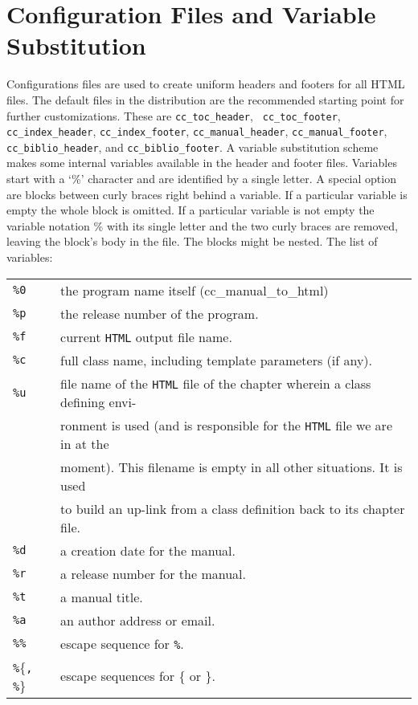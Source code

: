 \documentclass[11pt]{article}
\begin{document}
\section{Configuration Files and Variable Substitution}

 Configurations files are
used to create uniform headers and footers for all HTML files.  The
default files in the distribution are the recommended starting point
for further customizations. These are {\tt cc\_toc\_header}, {\tt
  cc\_toc\_footer}, {\tt cc\_index\_header}, {\tt cc\_index\_footer},
{\tt cc\_manual\_header}, {\tt cc\_manual\_footer}, {\tt
  cc\_biblio\_header}, and {\tt cc\_biblio\_footer}.  A variable
substitution scheme makes some internal variables available in the
header and footer files. Variables start with a `\%' character and are
identified by a single letter. A special option are blocks between
curly braces right behind a variable. If a particular variable is
empty the whole block is omitted. If a particular variable is not
empty the variable notation \% with its single letter and the two
curly braces are removed, leaving the block's body in the file. The
blocks might be nested. The list of variables:

\begin{tabular}{ll}
    {\tt\%0}  &  the program name itself (cc\_manual\_to\_html) \\
    {\tt\%p}  &  the release number of the program. \\
    {\tt\%f}  &  current {\tt HTML} output file name. \\
    {\tt\%c}  &  full class name, including template parameters (if any). \\
    {\tt\%u}  &  file name of the {\tt HTML} file of the chapter wherein a
    class defining envi- \\ & ronment is used (and is responsible for the
    {\tt HTML} file we are in at the\\ &  moment). This filename is empty
    in all other situations. It is used \\ & to build an up-link from a
    class definition back to its chapter file. \\
    {\tt\%d}  &  a creation date for the manual.\\
    {\tt\%r}  &  a release number for the manual.\\
    {\tt\%t}  &  a manual title. \\
    {\tt\%a}  &  an author address or email.\\
    {\tt\%\%}  &  escape sequence for {\tt\%}.\\
    {\tt\%}\{{\tt , \%}\}  &  escape sequences for \{ or \}.
\end{tabular}
\end{document}
